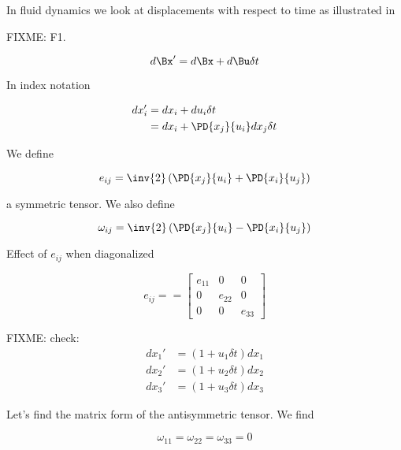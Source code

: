 
In fluid dynamics we look at displacements with respect to time as illustrated in

FIXME: F1.

\begin{equation}\label{eqn:continuumL8:230}
d\Bx' = d\Bx + d\Bu \delta t
\end{equation}

In index notation

\begin{align*}
dx_i'
&= dx_i + du_i \delta t \\
&= dx_i + \PD{x_j}{u_i} dx_j \delta t
\end{align*}

We define

\begin{equation}\label{eqn:continuumL8:250}
e_{ij} = \inv{2} \left(
\PD{x_j}{u_i} +
\PD{x_i}{u_j} \right)
\end{equation}

a symmetric tensor.  We also define

\begin{equation}\label{eqn:continuumL8:270}
\omega_{ij} = \inv{2} \left(
\PD{x_j}{u_i}
-\PD{x_i}{u_j} \right)
\end{equation}

Effect of $e_{ij}$ when diagonalized

\begin{equation}\label{eqn:continuumL8:290}
e_{ij} =
=
\begin{bmatrix}
e_{11} & 0 & 0 \\
0 & e_{22} & 0 \\
0 & 0 & e_{33}
\end{bmatrix}
\end{equation}

FIXME: check:
\begin{align}\label{eqn:continuumL8:310}
dx_1' &= ( 1 + u_1 \delta t) dx_1 \\
dx_2' &= ( 1 + u_2 \delta t) dx_2 \\
dx_3' &= ( 1 + u_3 \delta t) dx_3
\end{align}

Let's find the matrix form of the antisymmetric tensor.  We find

\begin{equation}\label{eqn:continuumL8:330}
\omega_{11} = \omega_{22} = \omega_{33} = 0
\end{equation}

